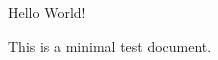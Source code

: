\documentclass{article}
\begin{document}
Hello World!

This is a minimal test document.
\end{document}

